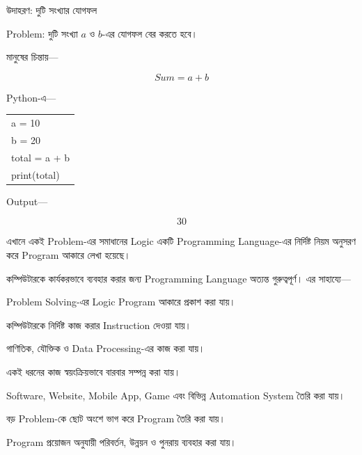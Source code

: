 \begin{examplebox}{উদাহরণ: দুটি সংখ্যার যোগফল}

Problem: দুটি সংখ্যা \(a\) ও \(b\)-এর যোগফল বের করতে হবে।

মানুষের চিন্তায়—

\[
Sum=a+b
\]

Python-এ—

\begin{center}

\begin{tabular}{@{}l@{}}
\textenglish{\ttfamily a = 10}\\
\textenglish{\ttfamily b = 20}\\
\textenglish{\ttfamily total = a + b}\\
\textenglish{\ttfamily print(total)}
\end{tabular}

\end{center}

Output—

\[
\boxed{30}
\]

এখানে একই Problem-এর সমাধানের Logic একটি Programming Language-এর
নির্দিষ্ট নিয়ম অনুসরণ করে Program আকারে লেখা হয়েছে।

\end{examplebox}


কম্পিউটারকে কার্যকরভাবে ব্যবহার করার জন্য Programming Language
অত্যন্ত গুরুত্বপূর্ণ। এর সাহায্যে—

\begin{compacttwocolpoints}

\item Problem Solving-এর Logic Program আকারে প্রকাশ করা যায়।

\item কম্পিউটারকে নির্দিষ্ট কাজ করার Instruction দেওয়া যায়।

\item গাণিতিক, যৌক্তিক ও Data Processing-এর কাজ করা যায়।

\item একই ধরনের কাজ স্বয়ংক্রিয়ভাবে বারবার সম্পন্ন করা যায়।

\item Software, Website, Mobile App, Game এবং বিভিন্ন
Automation System তৈরি করা যায়।

\item বড় Problem-কে ছোট অংশে ভাগ করে Program তৈরি করা যায়।

\item Program প্রয়োজন অনুযায়ী পরিবর্তন, উন্নয়ন ও পুনরায় ব্যবহার করা যায়।

\end{compacttwocolpoints}

